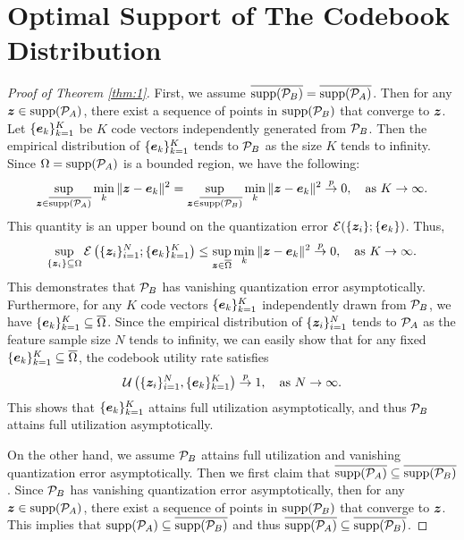 
\section{Optimal Support of The Codebook Distribution}

\begin{proof}[Proof of Theorem \ref{thm:1}]
    First, we assume $\overline{\mathrm{supp}(\mathcal{P}_B)}=\overline{\mathrm{supp}(\mathcal{P}_A)}$. Then for any $\bm{z}\in \mathrm{supp}(\mathcal{P}_A)$, there exist a sequence of points in $\mathrm{supp}(\mathcal{P}_B)$ that converge to $\bm{z}$. Let $\{\bm{e}_k\}_{k=1}^K$ be $K$ code vectors independently generated from $\mathcal{P}_B$. 
    Then the empirical distribution of $\{\bm{e}_k\}_{k=1}^K$ tends to $\mathcal{P}_B$ as the  size $K$ tends to infinity. 
    Since $\Omega=\mathrm{supp}(\mathcal{P}_A)$ is a bounded region,  we have the following: 
\begin{align}    \sup_{\bm{z}\in\overline{\mathrm{supp}(\mathcal{P}_A)}}\min_{k}\| \bm{z}-\bm{e}_k\|^2= \sup_{\bm{z}\in\overline{\mathrm{supp}(\mathcal{P}_B)}}\min_{k}\| \bm{z}-\bm{e}_k\|^2\overset{p}{\to}0,\quad \textnormal{as }K\to\infty.
\end{align}
    This quantity is an upper bound on the quantization error $\mathcal{E}(\{\bm{z}_i\};\{\bm{e}_k\})$. Thus,
    \begin{align}
    \sup_{\{\bm{z}_i\}\subseteq\Omega}\mathcal{E}\left(\{\bm{z}_i\}_{i=1}^N;\{\bm{e}_k\}_{k=1}^K\right)\leq \sup_{\bm{z}\in\overline{\Omega}}\min_{k}\| \bm{z}-\bm{e}_k\|^2\overset{p}{\to}0, \quad \textnormal{as }K\to\infty.
    \end{align}
    This demonstrates that $\mathcal{P}_B$ has vanishing quantization error asymptotically. Furthermore, for any $K$ code vectors $\{\bm{e}_k\}_{k=1}^K$ independently drawn from $\mathcal{P}_B$, we have $\{\bm{e}_k\}_{k=1}^K\subseteq\overline{\Omega}$. Since the empirical distribution of $\{\bm{z}_i\}_{i=1}^N$ tends to $\mathcal{P}_A$ as the feature sample size $N$ tends to infinity, we can easily show that for any fixed $\{\bm{e}_k\}_{k=1}^K\subseteq\overline{\Omega}$, the codebook utility rate satisfies
    \begin{align}
    \mathcal{U}\left(\{\bm{z}_i\}_{i=1}^N,\{\bm{e}_k\}_{k=1}^K\right)\overset{p}{\to}1,\quad\textnormal{as }N\to\infty.
    \end{align}
    This shows that $\{\bm{e}_k\}_{k=1}^K$ attains full utilization asymptotically, and thus $\mathcal{P}_B$ attains full utilization asymptotically. 

    On the other hand, we assume $\mathcal{P}_B$ attains full utilization and vanishing quantization error asymptotically. Then we first claim that $\overline{\mathrm{supp}(\mathcal{P}_A)}\subseteq\overline{\mathrm{supp}(\mathcal{P}_B)}$. Since $\mathcal{P}_B$ has vanishing quantization error asymptotically, then for any $\bm{z}\in\mathrm{supp}(\mathcal{P}_A)$, there exist a sequence of points in $\mathrm{supp}(\mathcal{P}_B)$ that converge to $\bm{z}$. This implies that $\mathrm{supp}(\mathcal{P}_A)\subseteq\overline{\mathrm{supp}(\mathcal{P}_B)}$ and thus $\overline{\mathrm{supp}(\mathcal{P}_A)}\subseteq\overline{\mathrm{supp}(\mathcal{P}_B)}$. 
    

\end{proof}

